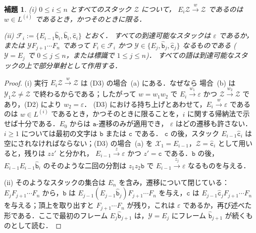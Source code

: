 \documentclass[11pt,a4paper]{ltjsarticle}
\numberwithin{equation}{section}
\theoremstyle{plain}
\newtheorem{lemma}[theorem]{補題}
\theoremstyle{definition}
\theoremstyle{remark}
\newcommand{\eps}{\varepsilon}
\theoremstyle{plain}
\begin{document}
\begin{lemma}\label{lem:app-br-recognition}
\label{lem:app-tl-reachable}
\textup{(i)} $0\le i\le n$ とすべてのスタック $\mathcal Z$ について，
$E_i\mathcal Z\xrightarrow{w}\mathcal Z$ であるのは $w\in L^{(i)}$ であるとき，かつそのときに限る．

\textup{(ii)} $\mathcal F_i:=\{E_{i-1}\hat{\mathtt b}_i,\hat{\mathtt b}_i,\hat{\mathtt c}_i\}$ とおく．
すべての到達可能なスタックは $\eps$ であるか，または $\mathcal YF_{j+1}\cdots F_n$ であって
$F_i\in\mathcal F_i$ かつ $\mathcal Y\in\{E_j,\hat{\mathtt b}_j,\hat{\mathtt c}_j\}$ なるものである
\textup($\mathcal Y=E_j$ で $0\le j\le n$，または標識で $1\le j\le n$\textup)．
すべての語は到達可能なスタックの上で部分単射として作用する．
\end{lemma}

\begin{proof}
(i) 実行 $E_i\mathcal Z\xrightarrow{w}\mathcal Z$ は (D3) の場合~(a) にある．なぜなら
場合~(b) は $\mathcal Y_1\mathcal Z\ne\mathcal Z$ で終わるからである；したがって $w=w_1w_2$ で
$E_i\xrightarrow{w_1}\eps$ かつ $\mathcal Z\xrightarrow{w_2}\mathcal Z$ であり，(D2) により $w_2=\eps$．
(D3) における持ち上げとあわせて，$E_i\xrightarrow{w}\eps$ であるのは
$w\in L^{(i)}$ であるとき，かつそのときに限ることを，$i$ に関する帰納法で示せば十分である．$E_0$ からは $\mathtt a$-遷移のみが適用でき，
$\eps$ はどの遷移も許さない．$i\ge1$ については最初の文字は $\mathtt b$ または $\mathtt c$ である．
$\mathtt c$ の後，スタック $E_{i-1}\hat{\mathtt c}_i$ は空にされなければならない；(D3) の場合~(a) を
$\mathcal X_1=E_{i-1}$，$\mathcal Z=\hat{\mathtt c}_i$ として用いると，残りは $zz'$ と分かれ，
$E_{i-1}\xrightarrow{z}\eps$ かつ $z'=\mathtt c$ である．$\mathtt b$ の後，
$E_{i-1}E_{i-1}\hat{\mathtt b}_i$ のそのような二回の分割は $z_1z_2\mathtt b$ で
$E_{i-1}\xrightarrow{z_j}\eps$ なるものを与える．

(ii) そのようなスタックの集合は $E_n$ を含み，遷移について閉じている：
$E_jF_{j+1}\cdots F_n$ から，$\mathtt b$ は
$E_{j-1}(E_{j-1}\hat{\mathtt b}_j)F_{j+1}\cdots F_n$ を与え，$\mathtt c$ は
$E_{j-1}\hat{\mathtt c}_jF_{j+1}\cdots F_n$ を与える；頂上を取り出すと
$F_{j+1}\cdots F_n$ が残り，これは $\eps$ であるか，再び述べた形である．ここで最初のフレーム
$E_j\hat{\mathtt b}_{j+1}$ は，$\mathcal Y=E_j$ にフレーム
$\hat{\mathtt b}_{j+1}$ が続くものとして読む．


\end{proof}
\end{document}
